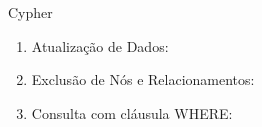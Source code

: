 \documentclass{if-beamer}
\begin{document}
\begin{frame}{Cypher}
\begin{overlayarea}{\textwidth}{\textheight}
{\begin{enumerate}
				\item Atualização de Dados:
				
				
				\item Exclusão de Nós e Relacionamentos:
				
				
				\item Consulta com cláusula WHERE:
				
			\end{enumerate}
			
		}
	\end{overlayarea}
	
\end{frame}
\end{document}
